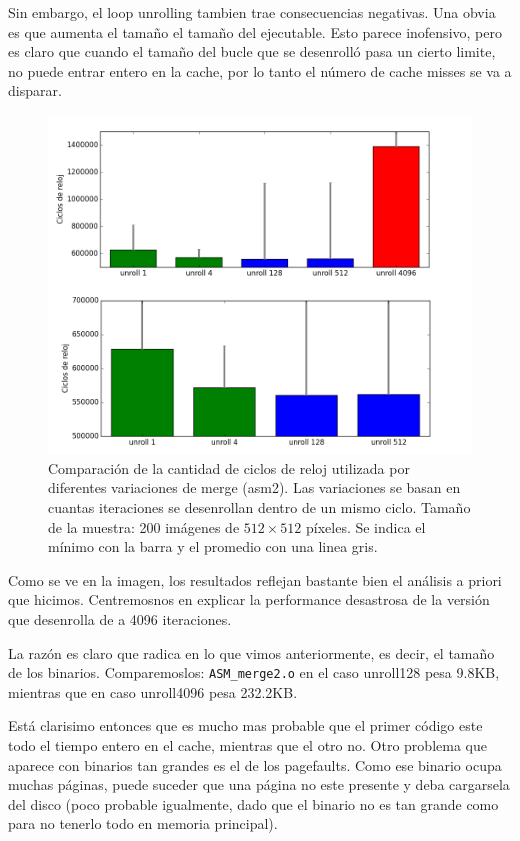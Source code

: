 Sin embargo, el loop unrolling tambien trae consecuencias negativas. Una obvia es que aumenta el tamaño el tamaño del ejecutable. Esto parece inofensivo, pero es claro que cuando el tamaño del bucle que se desenrolló pasa un cierto limite, no puede entrar entero en la cache, por lo tanto el número de cache misses se va a disparar.

\begin{figure}[H] 
	\centering
  \includegraphics[scale=0.7]{images/merge-unroll.png}
  \caption{Comparación de la cantidad de ciclos de reloj utilizada por diferentes variaciones de merge (asm2). Las variaciones se basan en cuantas iteraciones se desenrollan dentro de un mismo ciclo. Tamaño de la muestra: 200 imágenes de $512 \times 512$ píxeles. Se indica el mínimo con la barra y el promedio con una linea gris.}
\end{figure}

Como se ve en la imagen, los resultados reflejan bastante bien el análisis a priori que hicimos. Centremosnos en explicar la performance desastrosa de la versión que desenrolla de a 4096 iteraciones.

La razón es claro que radica en lo que vimos anteriormente, es decir, el tamaño de los binarios. Comparemoslos: \texttt{ASM\_merge2.o} en el caso unroll128 pesa 9.8KB, mientras que en caso unroll4096 pesa 232.2KB.

Está clarisimo entonces que es mucho mas probable que el primer código este todo el tiempo entero en el cache, mientras que el otro no. Otro problema que aparece con binarios tan grandes es el de los pagefaults. Como ese binario ocupa muchas páginas, puede suceder que una página no este presente y deba cargarsela del disco (poco probable igualmente, dado que el binario no es tan grande como para no tenerlo todo en memoria principal).

